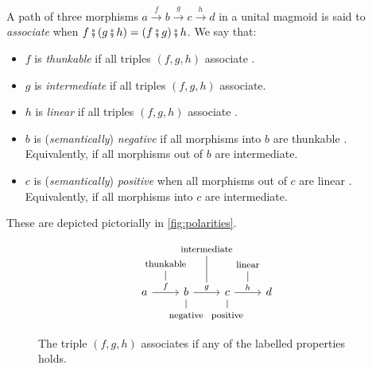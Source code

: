 \documentclass[runningheads]{llncs}
\newcommand*\rocqlogo{\usebox{\rocqlogobox}}
\newcommand{\lemmaref}[3]{\href{https://github.com/UniMath/UniMath/blob/94fae0eda57a778cec704bfa73b4ff525c9bc475/#1\#L#2?name=#3}{\rocqlogo}}
\newcommand{\dcomp}{\fatsemi}
\begin{document}
\begin{definition}[{\lemmaref{UniMath/CategoryTheory/Nonassociative/UnitalMagmoids/Core.v}{159}{is\_linear}}]
\label{def:polarities}
A path of three morphisms \(a \xrightarrow{f} b \xrightarrow{g} c
\xrightarrow{h} d\) in a unital magmoid is said to \emph{associate} when
\(f \dcomp (g \dcomp h) = (f \dcomp g) \dcomp h\).  We say that:
\begin{itemize}
\item \(f\) is \emph{thunkable} if all triples \((f,g,h)\) associate \cite{MunchMaccagnoni14,Mangel25}.
\item \(g\) is \emph{intermediate} if all triples \((f,g,h)\) associate.
\item \(h\) is \emph{linear} if all triples \((f,g,h)\) associate \cite{MunchMaccagnoni14,Mangel25}.
\item \(b\) is (\emph{semantically}) \emph{negative} if all
morphisms into \(b\) are thunkable \cite{Mangel25}. Equivalently, if all morphisms
out of \(b\) are intermediate.
\item \(c\) is (\emph{semantically}) \emph{positive}
when all morphisms out of \(c\) are linear
\cite{Mangel25}. Equivalently, if all morphisms into \(c\) are
intermediate.
\end{itemize}
These are depicted pictorially in \autoref{fig:polarities}.
\begin{figure}[H]
\[\begin{tikzpicture}[commutative diagrams/every diagram]
\matrix[matrix of math nodes, name=m, commutative diagrams/every cell] {
a & b & c & d \\};
\path[commutative diagrams/.cd, every arrow, every label]
  (m-1-1) edge node[name=f] {$f$} (m-1-2)
  (m-1-2) edge node[name=g] {$g$} (m-1-3)
  (m-1-3) edge node[name=h] {$h$} (m-1-4);
\draw[font=\footnotesize]
  (f) -- +(0,0.5) node[above] {thunkable}
  (g) -- +(0,1) node[above] {intermediate}
  (h) -- +(0,0.5) node[above] {linear}
  (m-1-2) -- +(0,-0.5) node[below] {negative}
  (m-1-3) -- +(0,-0.5) node[below] {positive};
\end{tikzpicture}\]
\caption{\label{fig:polarities}The triple \((f,g,h)\) associates if any of the labelled properties holds.}
\end{figure}
\end{definition}
\end{document}
